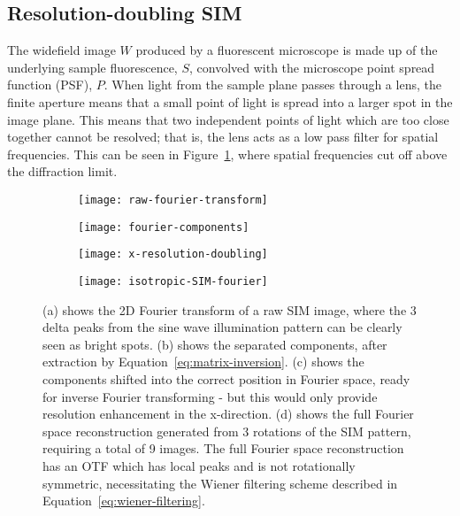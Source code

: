 
\subsection{Resolution-doubling SIM}

The widefield image $W$ produced by a fluorescent microscope is made up of the underlying sample fluorescence, $S$, convolved with the microscope point spread function (PSF), $P$. 
When light from the sample plane passes through a lens, the finite aperture means that a small point of light is spread into a larger spot in the image plane. 
This means that two independent points of light which are too close together cannot be resolved; that is, the lens acts as a low pass filter for spatial frequencies. 
This can be seen in Figure~\ref{fig:raw-fourier-transform}, where spatial frequencies cut off above the diffraction limit. 

\begin{figure}[p]
\centering
\begin{subfigure}[b]{0.49\textwidth}
	\texttt{[image: raw-fourier-transform]}
	\caption{}\label{fig:raw-fourier-transform}
\end{subfigure}
\hfill
\begin{subfigure}[b]{0.49\textwidth}
	\texttt{[image: fourier-components]}
	\caption{}\label{fig:fourier-components}
\end{subfigure}

\begin{subfigure}[b]{0.49\textwidth}
	\texttt{[image: x-resolution-doubling]}
	\caption{}\label{fig:x-resolution-doubling}
\end{subfigure}
\hfill
\begin{subfigure}[b]{0.49\textwidth}
	\texttt{[image: isotropic-SIM-fourier]}
	\caption{}\label{fig:isotropic-SIM-fourier}
\end{subfigure}
\caption[LAG SIM: Reconstruction of SIM images takes place in Fourier space]{(a) shows the 2D Fourier transform of a raw SIM image, where the 3 delta peaks from the sine wave illumination pattern can be clearly seen as bright spots. (b) shows the separated components, after extraction by Equation~\ref{eq:matrix-inversion}. (c) shows the components shifted into the correct position in Fourier space, ready for inverse Fourier transforming - but this would only provide resolution enhancement in the x-direction. (d) shows the full Fourier space reconstruction generated from 3 rotations of the SIM pattern, requiring a total of 9 images. The full Fourier space reconstruction has an OTF which has local peaks and is not rotationally symmetric, necessitating the Wiener filtering scheme described in Equation~\ref{eq:wiener-filtering}.}
\label{fig:fourier-reconstruction}
\end{figure}

